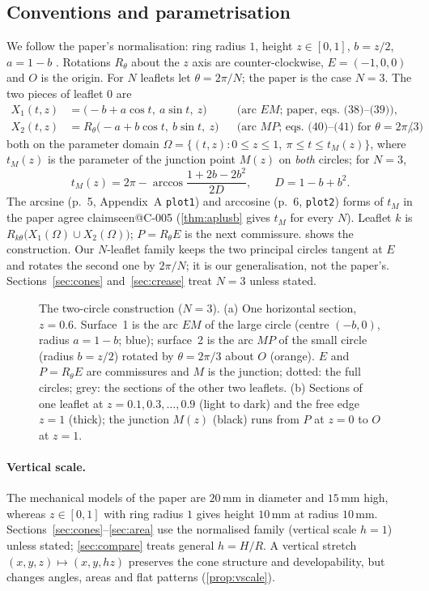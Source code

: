 \documentclass[11pt,a4paper]{article}
\makeatletter
\theoremstyle{plain}
\theoremstyle{remark}
\newcommand{\claim}[1]{\ifcsname claimseen@#1\endcsname\else\expandafter\gdef\csname claimseen@#1\endcsname{}\label{claim:#1}\fi}
\makeatother
\begin{document}
\subsection{Conventions and parametrisation}
We follow the paper's normalisation: ring radius $1$, height $z\in[0,1]$, $b=z/2$, $a=1-b$ \citep[eq.~(29) and the proof
of Prop.~1]{McKee2026}. Rotations $R_\theta$ about the $z$ axis are counter-clockwise, $E=(-1,0,0)$ and $O$ is the origin.
For $N$ leaflets let $\theta=2\pi/N$; the paper is the case $N=3$. The two pieces of leaflet $0$ are
\begin{align}
X_1(t,z) &= \big(-b+a\cos t,\ a\sin t,\ z\big) &&\text{(arc $EM$; paper, eqs.~(38)--(39))},\label{eq:X1}\\
X_2(t,z) &= R_\theta\big(-a+b\cos t,\ b\sin t,\ z\big) &&\text{(arc $MP$; eqs.~(40)--(41) for $\theta=2\pi/3$)},\label{eq:X2}
\end{align}
both on the parameter domain $\Omega=\{(t,z): 0\le z\le 1,\ \pi\le t\le t_M(z)\}$, where $t_M(z)$ is the parameter of the
junction point $M(z)$ on \emph{both} circles; for $N=3$,
\[ t_M(z)=2\pi-\arccos\frac{1+2b-2b^2}{2D},\qquad D=1-b+b^2 . \]
The arcsine (p.~5, Appendix~A \texttt{plot1}) and arccosine (p.~6, \texttt{plot2}) forms of $t_M$ in the paper agree
\claim{C-005} (\cref{thm:aplusb} gives $t_M$ for every $N$). Leaflet $k$ is $R_{k\theta}\big(X_1(\Omega)\cup X_2(\Omega)\big)$;
$P=R_\theta E$ is the next commissure.  shows the construction. Our $N$-leaflet family keeps the two
principal circles tangent at $E$ and rotates the second one by $2\pi/N$; it is our generalisation, not the paper's.
Sections~\ref{sec:cones} and~\ref{sec:crease} treat $N=3$ unless stated.

\begin{figure}[t]\centering

\caption{The two-circle construction ($N=3$). (a) One horizontal section, $z=0.6$. Surface~1 is the arc $EM$ of the large
circle (centre $(-b,0)$, radius $a=1-b$; blue); surface~2 is the arc $MP$ of the small circle (radius $b=z/2$) rotated by
$\theta=2\pi/3$ about $O$ (orange). $E$ and $P=R_\theta E$ are commissures and $M$ is the junction; dotted: the full circles;
grey: the sections of the other two leaflets. (b) Sections of one leaflet at $z=0.1,0.3,\dots,0.9$ (light to dark) and the
free edge $z=1$ (thick); the junction $M(z)$ (black) runs from $P$ at $z=0$ to $O$ at $z=1$.}
\label{fig:construction}
\end{figure}

\paragraph{Vertical scale.} The mechanical models of the paper are $20$\,mm in diameter and $15$\,mm high, whereas
$z\in[0,1]$ with ring radius $1$ gives height $10$\,mm at radius $10$\,mm. Sections~\ref{sec:cones}--\ref{sec:area} use
the normalised family (vertical scale $h=1$) unless stated; \cref{sec:compare} treats general $h=H/R$. A vertical stretch
$(x,y,z)\mapsto(x,y,hz)$ preserves the cone structure and developability, but changes angles, areas and flat patterns
(\cref{prop:vscale}).
\end{document}
